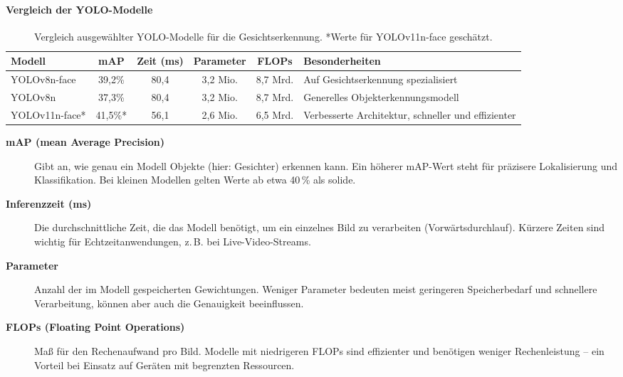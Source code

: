 \paragraph{Vergleich der YOLO-Modelle}
\begin{table}[H]
    \small
    \setlength{\tabcolsep}{6pt} %
    \renewcommand{\arraystretch}{1.2} %
    \centering
    \begin{tabular}{|l|c|c|c|c|p{3.8cm}|}
    \hline
    \textbf{Modell} & \textbf{mAP} & \textbf{Zeit (ms)} & \textbf{Parameter} & \textbf{FLOPs} & \textbf{Besonderheiten} \\
    \hline
    YOLOv8n-face   & 39{,}2\%  & 80{,}4  & 3{,}2 Mio. & 8{,}7 Mrd. & Auf Gesichtserkennung spezialisiert \\
    YOLOv8n        & 37{,}3\%  & 80{,}4  & 3{,}2 Mio. & 8{,}7 Mrd. & Generelles Objekterkennungsmodell \\
    YOLOv11n-face* & 41{,}5\%* & 56{,}1  & 2{,}6 Mio. & 6{,}5 Mrd. & Verbesserte Architektur, schneller und effizienter \\
    \hline
    \end{tabular}
    \caption{Vergleich ausgewählter YOLO-Modelle für die Gesichtserkennung. *Werte für YOLOv11n-face geschätzt.}
    \end{table}
    
\begin{description}
\item[\textbf{mAP (mean Average Precision)}] 
Gibt an, wie genau ein Modell Objekte (hier: Gesichter) erkennen kann. Ein höherer mAP-Wert steht für präzisere Lokalisierung und Klassifikation. Bei kleinen Modellen gelten Werte ab etwa 40\,\% als solide.

\item[\textbf{Inferenzzeit (ms)}] 
Die durchschnittliche Zeit, die das Modell benötigt, um ein einzelnes Bild zu verarbeiten (Vorwärtsdurchlauf). Kürzere Zeiten sind wichtig für Echtzeitanwendungen, z.\,B. bei Live-Video-Streams.

\item[\textbf{Parameter}] 
Anzahl der im Modell gespeicherten Gewichtungen. Weniger Parameter bedeuten meist geringeren Speicherbedarf und schnellere Verarbeitung, können aber auch die Genauigkeit beeinflussen.

\item[\textbf{FLOPs (Floating Point Operations)}] 
Maß für den Rechenaufwand pro Bild. Modelle mit niedrigeren FLOPs sind effizienter und benötigen weniger Rechenleistung – ein Vorteil bei Einsatz auf Geräten mit begrenzten Ressourcen.
\end{description}


